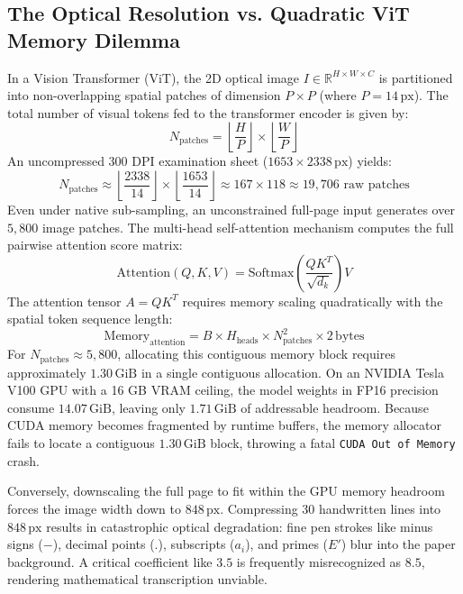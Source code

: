 \subsection{The Optical Resolution vs. Quadratic ViT Memory Dilemma}
In a Vision Transformer (ViT), the 2D optical image $I \in \mathbb{R}^{H \times W \times C}$ is partitioned into non-overlapping spatial patches of dimension $P \times P$ (where $P = 14\,\text{px}$). The total number of visual tokens fed to the transformer encoder is given by:
\begin{equation}
N_{\text{patches}} = \left\lfloor \frac{H}{P} \right\rfloor \times \left\lfloor \frac{W}{P} \right\rfloor
\end{equation}
An uncompressed 300 DPI examination sheet ($1653 \times 2338\,\text{px}$) yields:
\begin{equation}
N_{\text{patches}} \approx \left\lfloor \frac{2338}{14} \right\rfloor \times \left\lfloor \frac{1653}{14} \right\rfloor \approx 167 \times 118 \approx 19,706 \text{ raw patches}
\end{equation}
Even under native sub-sampling, an unconstrained full-page input generates over $5,800$ image patches. The multi-head self-attention mechanism computes the full pairwise attention score matrix:
\begin{equation}
\text{Attention}(Q, K, V) = \text{Softmax}\left(\frac{Q K^T}{\sqrt{d_k}}\right) V
\end{equation}
The attention tensor $A = Q K^T$ requires memory scaling quadratically with the spatial token sequence length:
\begin{equation}
\text{Memory}_{\text{attention}} = B \times H_{\text{heads}} \times N_{\text{patches}}^2 \times 2\,\text{bytes}
\end{equation}
For $N_{\text{patches}} \approx 5,800$, allocating this contiguous memory block requires approximately $1.30\,\text{GiB}$ in a single contiguous allocation. On an NVIDIA Tesla V100 GPU with a 16 GB VRAM ceiling, the model weights in FP16 precision consume $14.07\,\text{GiB}$, leaving only $1.71\,\text{GiB}$ of addressable headroom. Because CUDA memory becomes fragmented by runtime buffers, the memory allocator fails to locate a contiguous $1.30\,\text{GiB}$ block, throwing a fatal \texttt{CUDA Out of Memory} crash.

Conversely, downscaling the full page to fit within the GPU memory headroom forces the image width down to $848\,\text{px}$. Compressing 30 handwritten lines into $848\,\text{px}$ results in catastrophic optical degradation: fine pen strokes like minus signs ($-$), decimal points ($.$), subscripts ($a_i$), and primes ($E'$) blur into the paper background. A critical coefficient like $3.5$ is frequently misrecognized as $8.5$, rendering mathematical transcription unviable.

